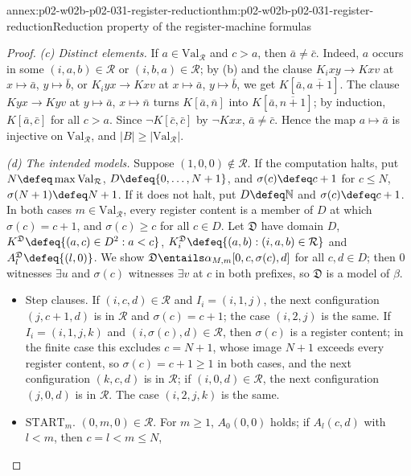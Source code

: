 \begin{annexitem}{annex:p02-w02b-p02-031-register-reduction}{thm:p02-w02b-p02-031-register-reduction}{Reduction property of the register-machine formulas}
\begin{proof}
\emph{(c) Distinct elements.}  If \(a\in\mathrm{Val}_{\mathcal R}\) and
\(c>a\), then \(\bar a\neq\bar c\).  Indeed, \(a\) occurs in some
\((i,a,b)\in\mathcal R\) or \((i,b,a)\in\mathcal R\); by (b) and the clause
\(K_ixy\to Kxv\) at \(x\mapsto\bar a\), \(y\mapsto\bar b\), or \(K_iyx\to Kxv\)
at \(x\mapsto\bar a\), \(y\mapsto\bar b\), we get
\(K[\bar a,\overline{a+1}]\).  The clause \(Kyx\to Kyv\) at \(y\mapsto\bar a\),
\(x\mapsto\bar n\) turns \(K[\bar a,\bar n]\) into \(K[\bar a,
\overline{n+1}]\); by induction, \(K[\bar a,\bar c]\) for all \(c>a\).  Since
\(\neg K[\bar c,\bar c]\) by \(\neg Kxx\), \(\bar a\neq\bar c\).  Hence the
map \(a\mapsto\bar a\) is injective on \(\mathrm{Val}_{\mathcal R}\), and
\(\lvert B\rvert\geq\lvert\mathrm{Val}_{\mathcal R}\rvert\).

\emph{(d) The intended models.}  Suppose \((1,0,0)\notin\mathcal R\).  If the
computation halts, put \(N\defeq\max\mathrm{Val}_{\mathcal R}\),
\(D\defeq\{0,\ldots,N+1\}\), and \(\sigma(c)\defeq c+1\) for \(c\leq N\),
\(\sigma(N+1)\defeq N+1\).  If it does not halt, put \(D\defeq\mathbb N\) and
\(\sigma(c)\defeq c+1\).  In both cases \(m\in\mathrm{Val}_{\mathcal R}\),
every register content is a member of \(D\) at which \(\sigma(c)=c+1\), and
\(\sigma(c)\geq c\) for all \(c\in D\).  Let \(\mathfrak D\) have domain \(D\),
\(K^{\mathfrak D}\defeq\{(a,c)\in D^{2}:a<c\}\), \(K_i^{\mathfrak D}\defeq
\{(a,b):(i,a,b)\in\mathcal R\}\) and \(A_l^{\mathfrak D}\defeq\{(l,0)\}\).
We show \(\mathfrak D\entails\alpha_{M,m}[0,c,\sigma(c),d]\) for all
\(c,d\in D\); then \(0\) witnesses \(\exists u\) and \(\sigma(c)\) witnesses
\(\exists v\) at \(c\) in both prefixes, so \(\mathfrak D\) is a model of
\(\beta\).
\begin{itemize}
\item Step clauses.  If \((i,c,d)\in\mathcal R\) and \(I_i=(i,1,j)\), the next
      configuration \((j,c+1,d)\) is in \(\mathcal R\) and \(\sigma(c)=c+1\);
      the case \((i,2,j)\) is the same.  If \(I_i=(i,1,j,k)\) and
      \((i,\sigma(c),d)\in\mathcal R\), then \(\sigma(c)\) is a register
      content; in the finite case this excludes \(c=N+1\), whose image
      \(N+1\) exceeds every register content, so \(\sigma(c)=c+1\geq1\) in
      both cases, and the next configuration
      \((k,c,d)\) is in \(\mathcal R\); if \((i,0,d)\in\mathcal R\), the next
      configuration \((j,0,d)\) is in \(\mathcal R\).  The case
      \((i,2,j,k)\) is the same.
\item \(\mathrm{START}_m\).  \((0,m,0)\in\mathcal R\).  For \(m\geq1\),
      \(A_0(0,0)\) holds; if \(A_l(c,d)\) with \(l<m\), then \(c=l<m\leq N\),

\end{itemize}
\end{proof}
\end{annexitem}
